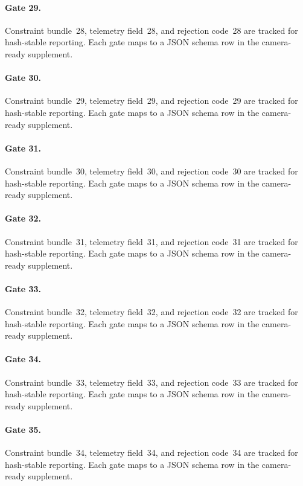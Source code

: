 \documentclass[sigconf,nonacm]{acmart}
\begin{document}
\paragraph{Gate 29.}
Constraint bundle~28, telemetry field~28, and rejection code~28 are tracked for hash-stable reporting. Each gate maps to a JSON schema row in the camera-ready supplement. %

\paragraph{Gate 30.}
Constraint bundle~29, telemetry field~29, and rejection code~29 are tracked for hash-stable reporting. Each gate maps to a JSON schema row in the camera-ready supplement. %

\paragraph{Gate 31.}
Constraint bundle~30, telemetry field~30, and rejection code~30 are tracked for hash-stable reporting. Each gate maps to a JSON schema row in the camera-ready supplement. %

\paragraph{Gate 32.}
Constraint bundle~31, telemetry field~31, and rejection code~31 are tracked for hash-stable reporting. Each gate maps to a JSON schema row in the camera-ready supplement. %

\paragraph{Gate 33.}
Constraint bundle~32, telemetry field~32, and rejection code~32 are tracked for hash-stable reporting. Each gate maps to a JSON schema row in the camera-ready supplement. %

\paragraph{Gate 34.}
Constraint bundle~33, telemetry field~33, and rejection code~33 are tracked for hash-stable reporting. Each gate maps to a JSON schema row in the camera-ready supplement. %

\paragraph{Gate 35.}
Constraint bundle~34, telemetry field~34, and rejection code~34 are tracked for hash-stable reporting. Each gate maps to a JSON schema row in the camera-ready supplement. %
\end{document}
